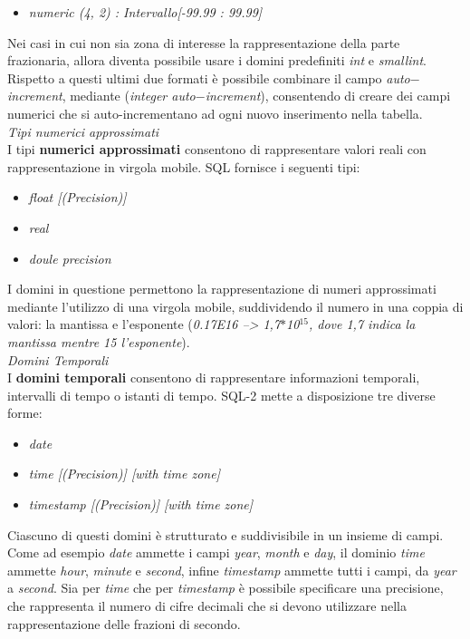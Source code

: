 \documentclass{article}
\begin{document}
\begin{itemize}[label={ }, leftmargin=1cm]
    \item \textit{numeric (4, 2) : Intervallo[-99.99 : 99.99]} 
\end{itemize}
Nei casi in cui non sia zona di interesse la rappresentazione della parte frazionaria, allora diventa possibile usare i domini predefiniti \textit{int} e \textit{smallint}. Rispetto a questi ultimi due formati è possibile combinare il campo \textit{auto$-$increment}, mediante (\textit{integer auto$-$increment}), consentendo di creare dei campi numerici che si auto-incrementano ad ogni nuovo inserimento nella tabella.\vspace*{14pt}\\
\textit{Tipi numerici approssimati}\\I tipi \textbf{numerici approssimati} consentono di rappresentare valori reali con rappresentazione in virgola mobile. SQL fornisce i seguenti tipi:
\begin{itemize}[label={ }, leftmargin=1cm]
    \itemsep0em
    \item \textit{float [(Precision)]}
    \item \textit{real}
    \item \textit{doule precision}
\end{itemize}
I domini in questione permettono la rappresentazione di numeri approssimati mediante l'utilizzo di una virgola mobile, suddividendo il numero in una coppia di valori: la mantissa e l'esponente (\textit{0.17E16 --> 1,7$*$10$^{15}$, dove 1,7 indica la mantissa mentre 15 l'esponente}).\vspace*{14pt}\\
\textit{Domini Temporali}\\I \textbf{domini temporali} consentono di rappresentare informazioni temporali, intervalli di tempo o istanti di tempo. SQL-2 mette a disposizione tre diverse forme:
\begin{itemize}[label={ }, leftmargin=1cm]
    \itemsep0em
    \item \textit{date}
    \item \textit{time [(Precision)] [with time zone]}
    \item \textit{timestamp [(Precision)] [with time zone]}
\end{itemize} 
Ciascuno di questi domini è strutturato e suddivisibile in un insieme di campi. Come ad esempio \textit{date} ammette i campi \textit{year}, \textit{month} e \textit{day}, il dominio \textit{time} ammette \textit{hour}, \textit{minute} e \textit{second}, infine \textit{timestamp} ammette tutti i campi, da \textit{year} a \textit{second}. Sia per \textit{time} che per \textit{timestamp} è possibile specificare una precisione, che rappresenta il numero di cifre decimali che si devono utilizzare nella rappresentazione delle frazioni di secondo.\vspace*{14pt}\\
\end{document}
